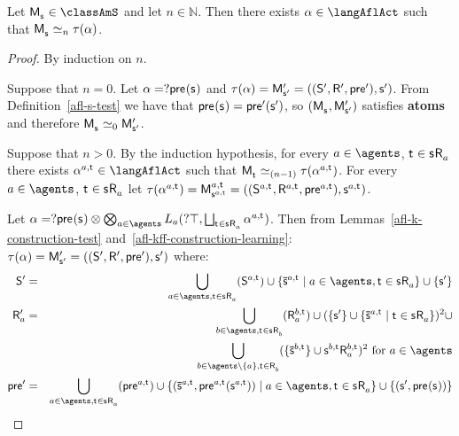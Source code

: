 \begin{proposition}\label{afl-s-correspondence}
Let $\aPModel{\aStateS} \in \classAmS$ and let $n \in \mathbb{N}$. 
Then there exists $\alpha \in \langAflAct$ such that $\aPModel{\aStateS} \bisimilar[n] \tau(\alpha)$.
\end{proposition}

\begin{proof}
By induction on $n$.

Suppose that $n = 0$. 
Let $\alpha = \test{\aPrecondition(\aStateS)}$ and $\tau(\alpha) = \aPModel[\prime]{\aStateS[\prime]} = \aPModelTuple[\prime]{\aStateS[\prime]}$. 
From Definition~\ref{afl-s-test} we have that $\aPrecondition(\aStateS) = \aPrecondition[\prime](\aStateS[\prime])$, so $(\aPModel{\aStateS}, \aPModel[\prime]{\aStateS[\prime]})$ satisfies {\bf atoms} and therefore $\aPModel{\aStateS} \bisimilar[0] \aPModel[\prime]{\aStateS[\prime]}$.

Suppose that $n > 0$. 
By the induction hypothesis, for every $\agentA \in \agents$, $\aStateT \in \aStateS \aAccessibility{\agentA}$ there exists $\alpha^{\agentA,\aStateT} \in \langAflAct$ such that 
$\aPModel{\aStateT} \bisimilar[(n - 1)] \tau(\alpha^{\agentA,\aStateT})$. 
For every $\agentA \in \agents$, $\aStateT \in \aStateS \aAccessibility{\agentA}$ let $\tau(\alpha^{\agentA,\aStateT}) = \aPModel[\agentA,\aStateT]{\aStateS[\agentA,\aStateT]} = \aPModelTuple[\agentA,\aStateT]{\aStateS[\agentA,\aStateT]}$.

Let $\alpha = \test{\aPrecondition(\aStateS)} \compose \bigcompose_{\agentA \in \agents} \learns_\agentA (\test{\top}, \bigchoice_{\aStateT \in \aStateS \aAccessibility{\agentA}} \alpha^{\agentA,\aStateT})$.
Then from Lemmas~\ref{afl-k-construction-test} and~\ref{afl-kff-construction-learning}: $\tau(\alpha) = \aPModel[\prime]{\aStateS[\prime]} =\aPModelTuple[\prime]{\aStateS[\prime]}$ where:
\begin{eqnarray*}
    \aStates[\prime] &=& \bigcup_{\agentA \in \agents, \aStateT \in \aStateS \aAccessibility{\agentA}} (\aStates[\agentA,\aStateT]) \cup \{\aPStateS[\agentA,\aStateT] \mid \agentA \in \agents, \aStateT \in \aStateS \aAccessibility{\agentA}\} \cup \{\aStateS[\prime]\}\\
    \aAccessibility[\prime]{\agentA} &=& \bigcup_{\agentB \in \agents, \aStateT \in \aStateS \aAccessibility{\agentB}} (\aAccessibility[\agentB,\aStateT]{\agentA}) \cup (\{\aStateS[\prime]\} \cup \{\aPStateS[\agentA,\aStateT] \mid \aStateT \in \aStateS \aAccessibility{\agentA}\})^2 \cup\\&&\quad\bigcup_{\agentB \in \agents \setminus \{\agentA\}, \aStateT \in \aAccessibility{\agentB}} (\{\aPStateS[\agentB,\aStateT]\} \cup \aStateS[\agentB,\aStateT] \aAccessibility[\agentB,\aStateT]{\agentA})^2 \text{ for } \agentA \in \agents\\
    \aPrecondition[\prime] &=& \bigcup_{\agentA \in \agents, \aStateT \in \aStateS \aAccessibility{\agentA}} (\aPrecondition[\agentA,\aStateT]) \cup \{(\aPStateS[\agentA,\aStateT], \aPrecondition[\agentA,\aStateT](\aStateS[\agentA,\aStateT])) \mid \agentA \in \agents, \aStateT \in \aStateS \aAccessibility{\agentA}\} \cup \{(\aStateS[\prime], \aPrecondition(\aStateS))\}
\end{eqnarray*}


\end{proof}
